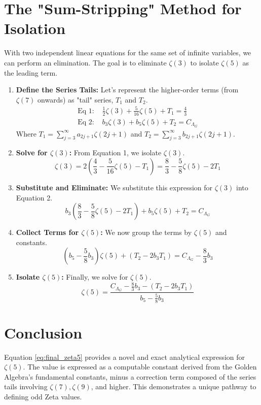 \documentclass{article}
\begin{document}
\section{The "Sum-Stripping" Method for Isolation}
With two independent linear equations for the same set of infinite variables, we can perform an elimination. The goal is to eliminate $\zeta(3)$ to isolate $\zeta(5)$ as the leading term.

\begin{enumerate}
    \item \textbf{Define the Series Tails:} Let's represent the higher-order terms (from $\zeta(7)$ onwards) as "tail" series, $T_1$ and $T_2$.
    \begin{align*}
    \text{Eq 1: } & \frac{1}{2}\zeta(3) + \frac{5}{16}\zeta(5) + T_1 = \frac{4}{3} \\
    \text{Eq 2: } & b_3\zeta(3) + b_5\zeta(5) + T_2 = C_{\Lambda_G}
    \end{align*}
    Where $T_1 = \sum_{j=3}^{\infty} a_{2j+1}\zeta(2j+1)$ and $T_2 = \sum_{j=3}^{\infty} b_{2j+1}\zeta(2j+1)$.
    
    \item \textbf{Solve for $\zeta(3)$:} From Equation 1, we isolate $\zeta(3)$.
    \begin{equation}
    \zeta(3) = 2 \left( \frac{4}{3} - \frac{5}{16}\zeta(5) - T_1 \right) = \frac{8}{3} - \frac{5}{8}\zeta(5) - 2T_1
    \end{equation}
    
    \item \textbf{Substitute and Eliminate:} We substitute this expression for $\zeta(3)$ into Equation 2.
    \begin{equation}
    b_3 \left( \frac{8}{3} - \frac{5}{8}\zeta(5) - 2T_1 \right) + b_5\zeta(5) + T_2 = C_{\Lambda_G}
    \end{equation}
    
    \item \textbf{Collect Terms for $\zeta(5)$:} We now group the terms by $\zeta(5)$ and constants.
    \begin{equation}
    \left(b_5 - \frac{5}{8}b_3\right)\zeta(5) + (T_2 - 2b_3T_1) = C_{\Lambda_G} - \frac{8}{3}b_3
    \end{equation}
    
    \item \textbf{Isolate $\zeta(5)$:} Finally, we solve for $\zeta(5)$.
    \begin{equation}
    \label{eq:final_zeta5}
    \zeta(5) = \frac{C_{\Lambda_G} - \frac{8}{3}b_3 - (T_2 - 2b_3T_1)}{b_5 - \frac{5}{8}b_3}
    \end{equation}
\end{enumerate}

\section{Conclusion}
Equation \ref{eq:final_zeta5} provides a novel and exact analytical expression for $\zeta(5)$. The value is expressed as a computable constant derived from the Golden Algebra's fundamental constants, minus a correction term composed of the series tails involving $\zeta(7), \zeta(9)$, and higher. This demonstrates a unique pathway to defining odd Zeta values.
\end{document}
